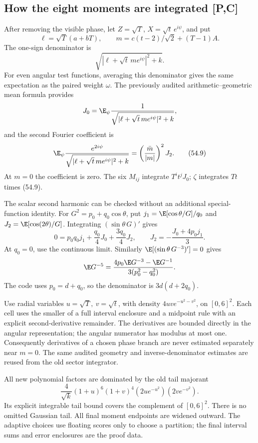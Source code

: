 \subsection{How the eight moments are integrated [P,C]}
After removing the visible phase, let \(Z=\sqrt T\),
\(X=\sqrt t\,e^{i\psi}\), and put
\[
 \ell=\sqrt T(a+bT),\qquad
 m=c(t-2)/\sqrt2+(T-1)A.
\]
The one-sign denominator is
\[
 \sqrt{|\ell+\sqrt t\,m e^{i\psi}|^2+k}.
\]
For even angular test functions, averaging this denominator gives
the same expectation as the paired weight \(\omega\).
The previously audited arithmetic--geometric mean formula provides
\[
 J_0=\E_\psi\frac1{\sqrt{|\ell+\sqrt t\,m e^{i\psi}|^2+k}},
\]
and the second Fourier coefficient is
\[
 \E_\psi\frac{e^{2i\psi}}
 {\sqrt{|\ell+\sqrt t\,m e^{i\psi}|^2+k}}
 =\left(\frac{\bar m}{|m|}\right)^2 J_2.
 \tag{54.9}
\]
At \(m=0\) the coefficient is zero.
The six \(M_{ij}\) integrate \(T^it^jJ_0\);
\(\zeta\) integrates \(Tt\) times (54.9).

The scalar second harmonic can be checked without an additional
special-function identity. For \(G^2=p_0+q_0\cos\theta\),
put \(j_1=\E[\cos\theta/G]/q_0\) and
\(J_2=\E[\cos(2\theta)/G]\).
Integrating \((\sin\theta\,G)'\) gives
\[
0=p_0q_0j_1+\frac{q_0}{4}J_0+\frac{3q_0}{4}J_2,
\qquad J_2=-\frac{J_0+4p_0j_1}{3}.
\]
At \(q_0=0\), use the continuous limit.
Similarly \(\E[(\sin\theta\,G^{-3})']=0\) gives
\[
\E G^{-5}=\frac{4p_0\E G^{-3}-\E G^{-1}}
 {3(p_0^2-q_0^2)}.
\]
The code uses \(p_0=d+q_0\), so the denominator is \(3d(d+2q_0)\).

Use radial variables \(u=\sqrt T,\ v=\sqrt t\), with density
\(4uv e^{-u^2-v^2}\), on \([0,6]^2\).
Each cell uses the smaller of a full interval enclosure and a midpoint
rule with an explicit second-derivative remainder.
The derivatives are bounded directly in the angular representation;
the angular numerator has modulus at most one.
Consequently derivatives of a chosen phase branch are never estimated
separately near \(m=0\).
The same audited geometry and inverse-denominator estimates are reused
from the old sector integrator.

All new polynomial factors are dominated by the old tail majorant
\[
 \frac4{\sqrt k}(1+u)^6(1+v)^4
       (2ue^{-u^2})(2ve^{-v^2}).
\]
Its explicit integrable tail bound covers the complement of
\([0,6]^2\). There is no omitted Gaussian tail.
All final moment endpoints are widened outward.
The adaptive choices use floating scores only to choose a partition;
the final interval sums and error enclosures are the proof data.

